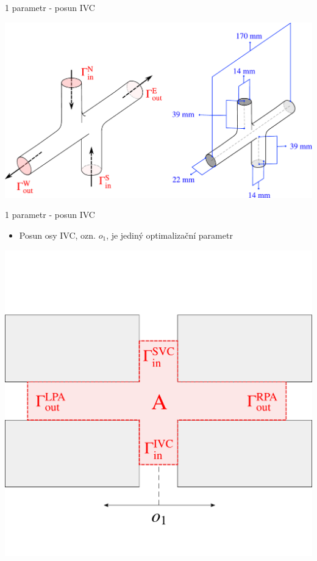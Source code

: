 \documentclass[aspectratio=169,xcolor=dvipsnames]{beamer}
\begin{document}
\begin{frame}{1 parametr - posun IVC}
	\begin{center}	
		\includegraphics[width=0.7\linewidth, trim={0 0 0 0}, clip]{Images/3d-tcpc-schema-combined.pdf}	
	\end{center}		
\end{frame}
\begin{frame}{1 parametr - posun IVC}
	\begin{itemize}
		\item Posun osy IVC, ozn. $o_1$, je jediný optimalizační parametr
	\end{itemize}
	\begin{center}
		\includegraphics[width=0.55\linewidth, trim={0 0 0 36mm}, clip]{Images/model1.pdf}
	\end{center}			
\end{frame}
\end{document}
